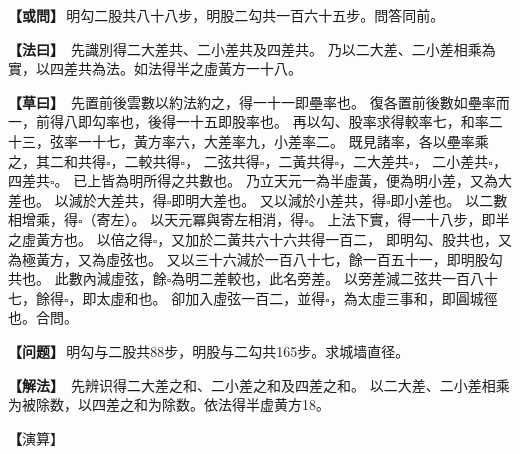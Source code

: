 \documentclass[11pt,a4paper]{article}
\let\origsquare\square
\renewcommand{\square}{\ensuremath{\origsquare}}%
\newcommand{\clOWEN}[1]{%
  \par\vspace{0.3em}%
  \noindent\textcolor{problemcolor}{\textbf{【或問】}}\,{\tradfont #1}\par\nopagebreak%
}
\newcommand{\mdOWEN}[1]{%
  \par\vspace{0.3em}%
  \noindent\textcolor{problemcolor}{\textbf{【问题】}}\,{\modfont #1}\par\nopagebreak%
}
\newcommand{\clFAYUE}[1]{%
  \par\noindent\textcolor{methodcolor}{\textbf{【法曰】}}\,{\tradfont #1}\par\nopagebreak%
}
\newcommand{\mdFAYUE}[1]{%
  \par\noindent\textcolor{methodcolor}{\textbf{【解法】}}\,{\modfont #1}\par\nopagebreak%
}
\newcommand{\clTSAOYUE}[1]{%
  \par\noindent\textcolor{workcolor}{\textbf{【草曰】}}\,{\tradfont #1}\par%
}
\newcommand{\mdTSAOYUE}[1]{%
  \par\noindent\textcolor{workcolor}{\textbf【演算】}}\,{\modfont #1}\par%
\begin{document}
\begin{paracol}{2}

\begin{leftcolumn}
\clOWEN{明勾二股共八十八步，明股二勾共一百六十五步。問答同前。}

\clFAYUE{%
先識別得二大差共、二小差共及四差共。
乃以二大差、二小差相乘為實，以四差共為法。如法得半之虛黃方一十八。}

\clTSAOYUE{%
先置前後雲數以約法約之，得一十一即壘率也。
復各置前後數如壘率而一，前得八即勾率也，後得一十五即股率也。
再以勾、股率求得較率七，和率二十三，弦率一十七，黃方率六，大差率九，小差率二。
既見諸率，各以壘率乘之，其二和共得$\square$，二較共得$\square$，
二弦共得$\square$，二黃共得$\square$，二大差共$\square$，
二小差共$\square$，四差共$\square$。
已上皆為明所得之共數也。
乃立天元一為半虛黃，便為明小差，又為大差也。
以減於大差共，得$\square$即明大差也。
又以減於小差共，得$\square$即小差也。
以二數相增乘，得$\square$（寄左）。
以天元冪與寄左相消，得$\square$。
上法下實，得一十八步，即半之虛黃方也。
以倍之得$\square$，又加於二黃共六十六共得一百二，
即明勾、股共也，又為極黃方，又為虛弦也。
又以三十六減於一百八十七，餘一百五十一，即明股勾共也。
此數內減虛弦，餘$\square$為明二差較也，此名旁差。
以旁差減二弦共一百八十七，餘得$\square$，即太虛和也。
卻加入虛弦一百二，並得$\square$，為太虛三事和，即圓城徑也。合問。}
\end{leftcolumn}

\switchcolumn

\begin{rightcolumn}
\mdOWEN{明勾与二股共88步，明股与二勾共165步。求城墙直径。}

\mdFAYUE{%
先辨识得二大差之和、二小差之和及四差之和。
以二大差、二小差相乘为被除数，以四差之和为除数。依法得半虚黄方18。}

\mdTSAOYUE{%
先取前后两数以约法约之，得11即垒率。
再各置前后数除以垒率，前得8即勾率，后得15即股率。
再以勾、股率求得较率7，和率23，弦率17，黄方率6，大差率9，小差率2。
既得诸率，各以垒率乘之，其二和共得$\square$，二较共得$\square$，
二弦共得$\square$，二黄共得$\square$，二大差共$\square$，
二小差共$\square$，四差共$\square$。
以上皆为明所得之共数。
设天元一为半虚黄，即为明小差，又为大差。
从大差共中减去得$\square$即明大差。
又从小差共中减去得$\square$即小差。
两数相乘得$\square$（寄左）。
以天元冪与寄左相消得$\square$。
上法下实，得18步即半虚黄方。
翻倍得$\square$，再加于二黄共66共得102，
即明勾、股之和，又为极黄方，又为虚弦。
又以36减于187余151即明股勾之和。
此数内减虚弦余$\square$为明二差之较，此名「傍差」。
以傍差减二弦共187余得$\square$即太虚和。
再加入虚弦102共得$\square$为太虚三事和即圆城径。符合所问。}
\end{rightcolumn}

\end{paracol}
\end{document}

